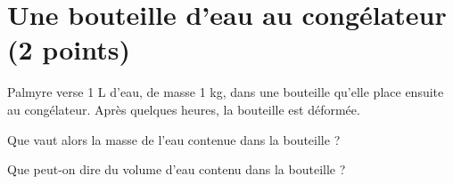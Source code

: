 \section{Une bouteille d'eau au congélateur (2 points)}\label{ex:congel}

Palmyre verse 1 L d'eau, de masse 1 kg, dans une bouteille qu'elle place ensuite au congélateur. Après quelques heures, la bouteille est déformée.

\begin{questions}
	\question[1] Que vaut alors la masse de l'eau contenue dans la bouteille ?
	
	\question[1] Que peut-on dire du volume d'eau contenu dans la bouteille ?
\end{questions}